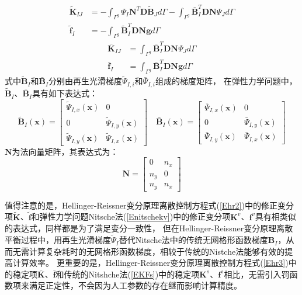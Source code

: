 \begin{subequations}\label{Ehr2}  
\begin{align}   
    \tilde{\pmb{K}}_{IJ}&=-\int_{\Gamma^g}\Psi_I\pmb{N}^T\pmb{D}\tilde{\pmb B}_Jd\Gamma-\int_{\Gamma^g}\bar{\pmb B}_I^T\pmb{D}\pmb{N}\Psi_Jd\Gamma\\
    \tilde{\pmb f}_I&=-\int_{\Gamma^g}\tilde{\pmb B}_I^T\pmb D\pmb N\pmb{g}d\Gamma
\end{align}
\end{subequations}
\begin{subequations}\label{Ehr3}
\begin{align} 
    \bar{\pmb K}_{IJ}&=\int_{\Gamma^g}\bar{\pmb B}_I^T\pmb D\pmb N\Psi_Jd\Gamma\\
    \bar{\pmb f}_I&=\int_{\Gamma^g}\bar{\pmb B}_I^T\pmb D\pmb N \pmb{g}d\Gamma
\end{align}
\end{subequations}
式中$\tilde{\pmb B}_I$和$\bar{\pmb B}_I$分别由再生光滑梯度$\tilde{\Psi}_{I,i}$和$\bar{\Psi}_{I,i}$组成的梯度矩阵，
在弹性力学问题中，$\tilde{\pmb B}_I$、$\bar{\pmb B}_I$具有如下表达式：
\begin{equation}
    \tilde{\pmb{B}}_I(\pmb{x})= \begin{bmatrix}\tilde{\Psi}_{I,x}(\pmb{x})&0\\0&\tilde{\Psi}_{I,y}(\pmb{x})\\\tilde{\Psi}_{I,y}(\pmb{x})&\tilde{\Psi}_{I,x}(\pmb{x}) \end{bmatrix} 
    \quad
    \bar{\pmb{B}}_I(\pmb{x})= \begin{bmatrix}\bar{\Psi}_{I,x}(\pmb{x})&0\\0&\bar{\Psi}_{I,y}(\pmb{x})\\\bar{\Psi}_{I,y}(\pmb{x})&\bar{\Psi}_{I,x}(\pmb{x}) \end{bmatrix}
\end{equation}
$\pmb N$为法向量矩阵，其表达式为：
\begin{equation}
    \pmb{N}=\begin{bmatrix} 0&n_x\\n_y&0\\n_y&n_x
    \end{bmatrix}
\end{equation}\par
值得注意的是，Hellinger-Reissner变分原理离散控制方程式(\ref{Ehr2})中的修正变分项$\tilde{\pmb K}$、$\tilde{\pmb f}$和弹性力学问题Nitsche法(\ref{Enitschekv})中的修正变分项$\pmb K^v$、$\pmb f^v$具有相类似的表达式，同样都是为了满足变分一致性，
但在Hellinger-Reissner变分原理离散平衡过程中，用再生光滑梯度$\tilde{\Psi}_I$替代Nitsche法中的传统无网格形函数梯度$\pmb{B}_I$，从而无需计算复杂耗时的无网格形函数梯度，相较于传统的Nistche法能够有效的提高计算效率。
更重要的是，Hellinger-Reissner变分原理离散控制方程式(\ref{Ehr3})中的稳定项$\bar{\pmb K}$、$\bar{\pmb f}$和传统的Nitshche法(\ref{EKFs})中的稳定项$\pmb{K}^s$、$\pmb f^s$相比，无需引入罚函数项来满足正定性，不会因为人工参数的存在继而影响计算精度。
